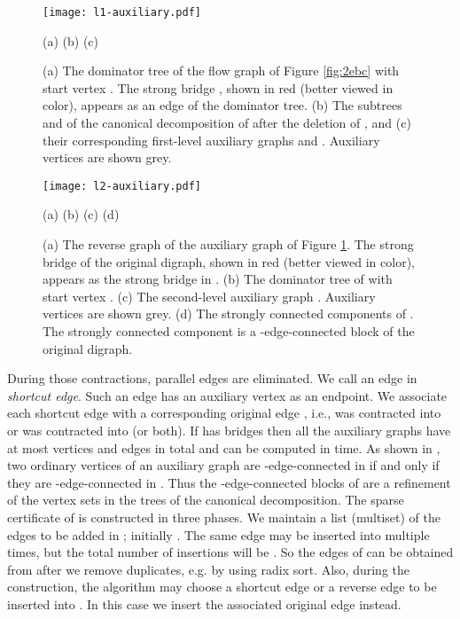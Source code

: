 \documentclass[11pt]{article}
\begin{document}
\begin{figure}[t!]
\begin{center}
\texttt{[image: l1-auxiliary.pdf]}
\end{center}
\vspace{-0.2cm}
\hspace{2.8cm} (a) \hspace{3.9cm} (b) \hspace{4.8cm} (c)
\caption{(a) The dominator tree  of the flow graph of Figure \ref{fig:2ebc} with start vertex . The strong bridge , shown in red (better viewed in color), appears as an edge of the dominator tree. (b) The subtrees  and  of the canonical decomposition of  after the deletion of , and (c) their corresponding first-level auxiliary graphs  and . Auxiliary vertices are shown grey.
}
\label{fig:l1-auxiliary}
\end{figure}
\begin{figure}[h!]
\begin{center}
\texttt{[image: l2-auxiliary.pdf]}
\end{center}
\vspace{-0.5cm}
\hspace{1.5cm} (a) \hspace{3cm} (b) \hspace{3.1cm} (c) \hspace{4.1cm} (d)
\caption{(a) The reverse graph  of the auxiliary graph  of Figure \ref{fig:l1-auxiliary}. The strong bridge  of the original digraph, shown in red (better viewed in color), appears as the strong bridge  in . (b) The dominator tree of  with start vertex . (c) The second-level auxiliary graph . Auxiliary vertices are shown grey. (d) The strongly connected components of .
The strongly connected component  is a -edge-connected block of the original digraph.
}
\label{fig:l2-auxiliary}
\end{figure}

During those contractions, parallel edges are eliminated. We call an edge in  \emph{shortcut edge}. Such an edge has an auxiliary vertex as an endpoint.
We associate each shortcut edge   with a corresponding original edge , i.e.,  was contracted into  or  was contracted into  (or both).
If  has  bridges then all the auxiliary graphs  have at most  vertices and  edges in total and can be computed in  time.
As shown in \cite{2ECB}, two ordinary vertices of an auxiliary graph  are -edge-connected in  if and only if they are -edge-connected in .
Thus the -edge-connected blocks of  are a refinement of the vertex sets in the trees of the canonical decomposition.
The sparse certificate of \cite{2ECB} is constructed in three phases.
We maintain a list (multiset)  of the edges to be added in ; initially . The same edge may be inserted into  multiple times, but the total number of insertions will be . So
the edges of  can be obtained from  after we remove duplicates, e.g. by  using radix sort. Also, during the construction, the algorithm may choose a shortcut edge or a reverse edge to be inserted into . In this case we insert the associated original edge instead.
\end{document}
